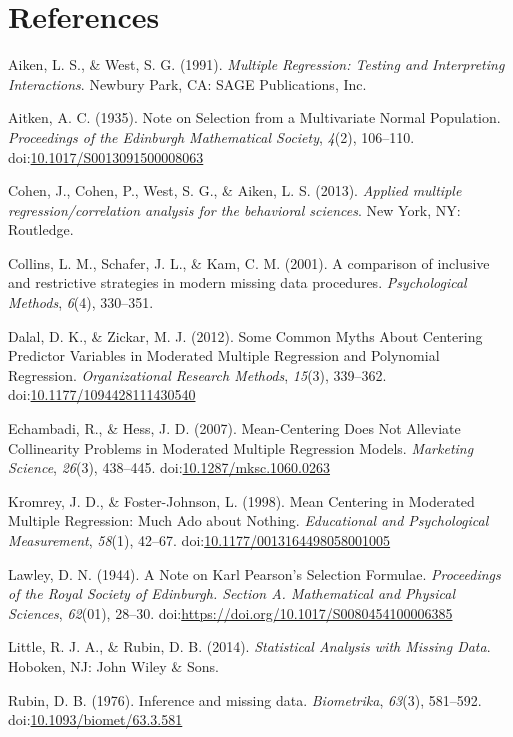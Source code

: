 \documentclass[english,man]{apa6}
\theoremstyle{definition}
\theoremstyle{definition}
\theoremstyle{remark}
\begin{document}
\newpage

\section{References}\label{references}

\setlength{\parindent}{-0.5in} \setlength{\leftskip}{0.5in}

\hypertarget{refs}{}
\hypertarget{ref-aiken_multiple_1991}{}
Aiken, L. S., \& West, S. G. (1991). \emph{Multiple Regression: Testing
and Interpreting Interactions}. Newbury Park, CA: SAGE Publications,
Inc.

\hypertarget{ref-aitken_note_1935}{}
Aitken, A. C. (1935). Note on Selection from a Multivariate Normal
Population. \emph{Proceedings of the Edinburgh Mathematical Society},
\emph{4}(2), 106--110.
doi:\href{https://doi.org/10.1017/S0013091500008063}{10.1017/S0013091500008063}

\hypertarget{ref-cohen_applied_2013}{}
Cohen, J., Cohen, P., West, S. G., \& Aiken, L. S. (2013). \emph{Applied
multiple regression/correlation analysis for the behavioral sciences}.
New York, NY: Routledge.

\hypertarget{ref-collins_comparison_2001}{}
Collins, L. M., Schafer, J. L., \& Kam, C. M. (2001). A comparison of
inclusive and restrictive strategies in modern missing data procedures.
\emph{Psychological Methods}, \emph{6}(4), 330--351.

\hypertarget{ref-dalal_common_2012}{}
Dalal, D. K., \& Zickar, M. J. (2012). Some Common Myths About Centering
Predictor Variables in Moderated Multiple Regression and Polynomial
Regression. \emph{Organizational Research Methods}, \emph{15}(3),
339--362.
doi:\href{https://doi.org/10.1177/1094428111430540}{10.1177/1094428111430540}

\hypertarget{ref-echambadi_mean-centering_2007}{}
Echambadi, R., \& Hess, J. D. (2007). Mean-Centering Does Not Alleviate
Collinearity Problems in Moderated Multiple Regression Models.
\emph{Marketing Science}, \emph{26}(3), 438--445.
doi:\href{https://doi.org/10.1287/mksc.1060.0263}{10.1287/mksc.1060.0263}

\hypertarget{ref-kromrey_mean_1998}{}
Kromrey, J. D., \& Foster-Johnson, L. (1998). Mean Centering in
Moderated Multiple Regression: Much Ado about Nothing. \emph{Educational
and Psychological Measurement}, \emph{58}(1), 42--67.
doi:\href{https://doi.org/10.1177/0013164498058001005}{10.1177/0013164498058001005}

\hypertarget{ref-lawley_note_1944}{}
Lawley, D. N. (1944). A Note on Karl Pearson's Selection Formulae.
\emph{Proceedings of the Royal Society of Edinburgh. Section A.
Mathematical and Physical Sciences}, \emph{62}(01), 28--30.
doi:\href{https://doi.org/https://doi.org/10.1017/S0080454100006385}{https://doi.org/10.1017/S0080454100006385}

\hypertarget{ref-little_statistical_2014}{}
Little, R. J. A., \& Rubin, D. B. (2014). \emph{Statistical Analysis
with Missing Data}. Hoboken, NJ: John Wiley \& Sons.

\hypertarget{ref-rubin_inference_1976}{}
Rubin, D. B. (1976). Inference and missing data. \emph{Biometrika},
\emph{63}(3), 581--592.
doi:\href{https://doi.org/10.1093/biomet/63.3.581}{10.1093/biomet/63.3.581}
\end{document}
